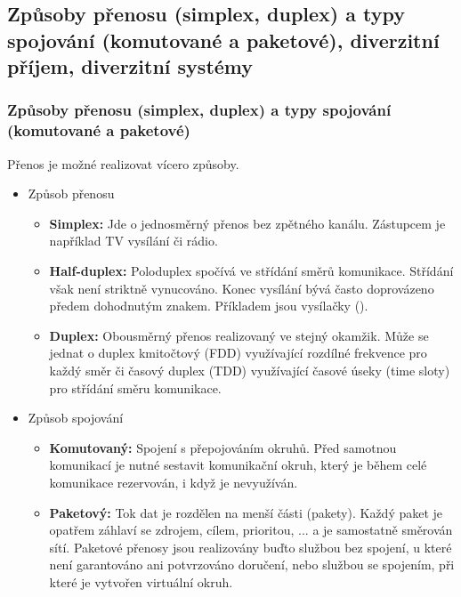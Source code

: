 	\subsection{Způsoby přenosu (simplex, duplex) a typy spojování (komutované a paketové), diverzitní příjem, diverzitní systémy}
		\subsubsection{Způsoby přenosu (simplex, duplex) a typy spojování (komutované a paketové)}
			Přenos je možné realizovat vícero způsoby.
			\begin{itemize}
				\item Způsob přenosu
				\begin{itemize}
					\item \textbf{Simplex:} Jde o jednosměrný přenos bez zpětného kanálu. Zástupcem je například TV vysílání či rádio.
					\item \textbf{Half-duplex:} Poloduplex spočívá ve střídání směrů komunikace. Střídání však není striktně vynucováno. Konec vysílání bývá často doprovázeno předem dohodnutým znakem. Příkladem jsou vysílačky ().
					\item \textbf{Duplex:} Obousměrný přenos realizovaný ve stejný okamžik. Může se jednat o duplex kmitočtový (FDD) využívající rozdílné frekvence pro každý směr či časový duplex (TDD) využívající časové úseky (time sloty) pro střídání směru komunikace.
				\end{itemize}
				\item Způsob spojování
				\begin{itemize}
					\item \textbf{Komutovaný:} Spojení s přepojováním okruhů. Před samotnou komunikací je nutné sestavit komunikační okruh, který je během celé komunikace rezervován, i když je nevyužíván.
					\item \textbf{Paketový:} Tok dat je rozdělen na menší části (pakety). Každý paket je opatřem záhlaví se zdrojem, cílem, prioritou, ... a je samostatně směrován sítí. Paketové přenosy jsou realizovány buďto službou bez spojení, u které není garantováno ani potvrzováno doručení, nebo službou se spojením, při které je vytvořen virtuální okruh.
				\end{itemize}
			\end{itemize}
